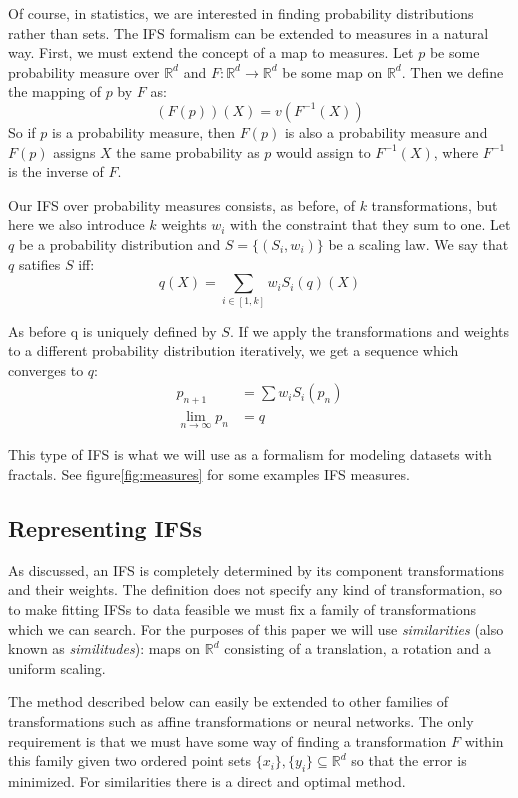 \documentclass[10pt,a4paper,oneside]{article}
\theoremstyle{definition}
\begin{document}
Of course, in statistics, we are interested in finding probability distributions rather than sets. The IFS formalism can be extended to measures in a natural way. First, we must extend the concept of a map to measures. Let $p$ be some probability measure over ${\mathbb R}^d$ and $F:{\mathbb R}^d \rightarrow {\mathbb R}^d$ be some map on ${\mathbb R}^d$. Then we define the mapping of $p$ by $F$ as:
\[
(F(p))(X) = v(F^{-1}(X))
\]
So if $p$ is a probability measure, then $F(p)$ is also a probability measure and $F(p)$ assigns $X$ the same probability as $p$ would assign to $F^{-1}(X)$, where $F^{-1}$ is the inverse of $F$.

Our IFS over probability measures consists, as before, of $k$ transformations, but here we also introduce $k$ weights $w_i$ with the constraint that they sum to one. Let $q$ be a probability distribution and $S = \{(S_i, w_i)\}$ be a scaling law. We say that $q$ satifies $S$ iff:
\[
q(X) = \sum_{i\in[1, k]} w_i S_i(q)(X)
\] 

As before q is uniquely defined by $S$. If we apply the transformations and weights to a different probability distribution iteratively, we get a sequence which converges to $q$:
\begin{align*}
p_{n+1} &= \sum w_i S_i(p_n) \\
\lim_{n \rightarrow \infty} p_n &= q 
\end{align*}

This type of IFS is what we will use as a formalism for modeling datasets with fractals. See figure\ref{fig:measures} for some examples IFS measures.

\subsection*{Representing IFSs}

As discussed, an IFS is completely determined by its component transformations and their weights. The definition does not specify any kind of transformation, so to make fitting IFSs to data feasible we must fix a family of transformations which we can search. For the purposes of this paper we will use \emph{similarities} (also known as \emph{similitudes}): maps on ${\mathbb R}^d$ consisting of a translation, a rotation and a uniform scaling.

The method described below can easily be extended to other families of transformations such as affine transformations or neural networks. The only requirement is that we must have some way of finding a transformation $F$ within this family given two ordered point sets $\{x_i\}, \{y_i\} \subseteq {\mathbb R}^d$ so that the error is minimized. For similarities there is a direct and optimal method. \cite{umeyama1991least}
\end{document}

